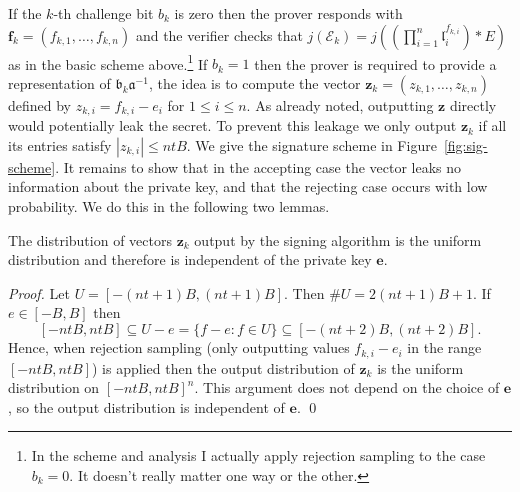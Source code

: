 \documentclass{llncs}
\newcommand{\E}{\mathcal{E}}
\renewcommand{\a}{\mathfrak{a}}
\renewcommand{\b}{\mathfrak{b}}
\renewcommand{\l}{\mathfrak{l}}
\newcommand{\e}{\mathbf{e}}
\newcommand{\f}{\mathbf{f}}
\newcommand{\z}{\mathbf{z}}
\begin{document}
If the $k$-th challenge bit $b_k$ is zero then the prover responds with $\f_k = ( f_{k,1}, \dots, f_{k,n} )$ and the verifier checks that $j(\E_k) = j( (\prod_{i=1}^n \l_i^{f_{k,i}}) * E )$ as in the basic scheme above.\footnote{In the scheme and analysis I actually apply rejection sampling to the case $b_k = 0$. It doesn't really matter one way or the other.}
If $b_k = 1$ then the prover is required to provide a representation of $\b_k \a^{-1}$, the idea is to compute the vector $\z_k = (z_{k,1}, \dots, z_{k,n}) $ defined by $z_{k,i} = f_{k,i} - e_i $ for $1 \le i \le n$.
As already noted, outputting $\z$ directly would potentially leak the secret.
To prevent this leakage we only output $\z_k$ if all its entries satisfy $| z_{k,i} | \le nt B$.
We give the signature scheme in Figure~\ref{fig:sig-scheme}.
It remains to show that in the accepting case the vector leaks no information about the private key, and that the rejecting case occurs with low probability. We do this in the following two lemmas.

\begin{lemma} \label{lem:sim2}
The distribution of vectors $\z_k$ output by the signing algorithm is the uniform distribution and therefore is independent of the private key $\e$.
\end{lemma}

\begin{proof}
Let $U = [-(nt+1)B, (nt+1)B]$. Then $\#U = 2(nt + 1)B + 1$.
If $e \in [-B, B]$ then 
\[
    [-ntB, ntB] \subseteq  U - e = \{ f - e : f \in U \} \subseteq [-(nt+2)B, (nt+2)B ].
\]
Hence, when rejection sampling (only outputting values $f_{k,i} - e_i$ in the range $[-ntB, ntB]$) is applied then the output distribution of $\z_k$ is the uniform distribution on $[-ntB, ntB]^n$.
This argument does not depend on the choice of $\e$, so the output distribution is independent of $\e$. \qed
\end{proof}
\end{document}

